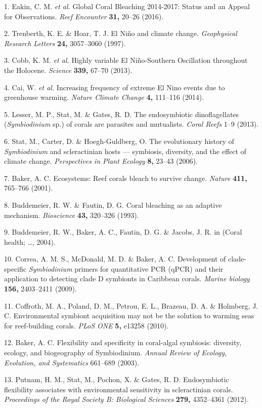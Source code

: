 \documentclass[]{article}
\begin{document}
\hypertarget{refs}{}
\hypertarget{ref-Eakin:2016vf}{}
1. Eakin, C. M. \emph{et al.} Global Coral Bleaching 2014-2017: Status
and an Appeal for Observations. \emph{Reef Encounter} \textbf{31,}
20--26 (2016).

\hypertarget{ref-Trenberth:1997vw}{}
2. Trenberth, K. E. \& Hoar, T. J. El Niño and climate change.
\emph{Geophysical Research Letters} \textbf{24,} 3057--3060 (1997).

\hypertarget{ref-Cobb:2013fe}{}
3. Cobb, K. M. \emph{et al.} Highly variable El Niño-Southern
Oscillation throughout the Holocene. \emph{Science} \textbf{339,} 67--70
(2013).

\hypertarget{ref-Cai:2014ky}{}
4. Cai, W. \emph{et al.} Increasing frequency of extreme El Nino events
due to greenhouse warming. \emph{Nature Climate Change} \textbf{4,}
111--116 (2014).

\hypertarget{ref-Lesser:2013tu}{}
5. Lesser, M. P., Stat, M. \& Gates, R. D. The endosymbiotic
dinoflagellates (\emph{Symbiodinium} sp.) of corals are parasites and
mutualists. \emph{Coral Reefs} 1--9 (2013).

\hypertarget{ref-Stat:2006ww}{}
6. Stat, M., Carter, D. \& Hoegh-Guldberg, O. The evolutionary history
of \emph{Symbiodinium} and scleractinian hosts --- symbiosis, diversity,
and the effect of climate change. \emph{Perspectives in Plant Ecology}
\textbf{8,} 23--43 (2006).

\hypertarget{ref-Baker:2001bf}{}
7. Baker, A. C. Ecosystems: Reef corals bleach to survive change.
\emph{Nature} \textbf{411,} 765--766 (2001).

\hypertarget{ref-Buddemeier:1993bb}{}
8. Buddemeier, R. W. \& Fautin, D. G. Coral bleaching as an adaptive
mechanism. \emph{Bioscience} \textbf{43,} 320--326 (1993).

\hypertarget{ref-Buddemeier:2004vj}{}
9. Buddemeier, R. W., Baker, A. C., Fautin, D. G. \& Jacobs, J. R. in
(Coral health; \ldots{}, 2004).

\hypertarget{ref-Correa:2009jy}{}
10. Correa, A. M. S., McDonald, M. D. \& Baker, A. C. Development of
clade-specific \emph{Symbiodinium} primers for quantitative PCR (qPCR)
and their application to detecting clade D symbionts in Caribbean
corals. \emph{Marine biology} \textbf{156,} 2403--2411 (2009).

\hypertarget{ref-Coffroth:2010ju}{}
11. Coffroth, M. A., Poland, D. M., Petrou, E. L., Brazeau, D. A. \&
Holmberg, J. C. Environmental symbiont acquisition may not be the
solution to warming seas for reef-building corals. \emph{PLoS ONE}
\textbf{5,} e13258 (2010).

\hypertarget{ref-Baker:2003uo}{}
12. Baker, A. C. Flexibility and specificity in coral-algal symbiosis:
diversity, ecology, and biogeography of Symbiodinium. \emph{Annual
Review of Ecology, Evolution, and Systematics} 661--689 (2003).

\hypertarget{ref-Putnam:2012bn}{}
13. Putnam, H. M., Stat, M., Pochon, X. \& Gates, R. D. Endosymbiotic
flexibility associates with environmental sensitivity in scleractinian
corals. \emph{Proceedings of the Royal Society B: Biological Sciences}
\textbf{279,} 4352--4361 (2012).
\end{document}
